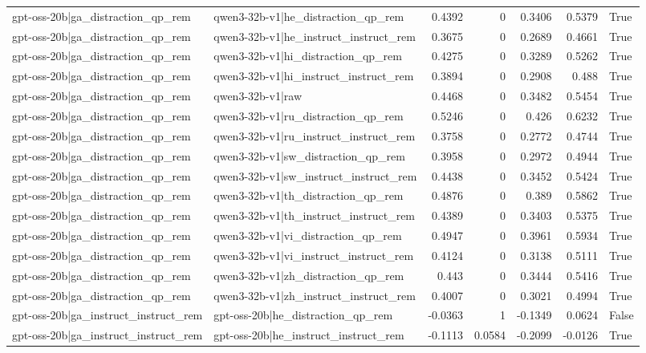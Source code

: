 \begin{table}
\begin{tabular}{l l r r r r l}
gpt-oss-20b|ga_distraction_qp_rem & qwen3-32b-v1|he_distraction_qp_rem & 0.4392 & 0 & 0.3406 & 0.5379 & True \\
gpt-oss-20b|ga_distraction_qp_rem & qwen3-32b-v1|he_instruct_instruct_rem & 0.3675 & 0 & 0.2689 & 0.4661 & True \\
gpt-oss-20b|ga_distraction_qp_rem & qwen3-32b-v1|hi_distraction_qp_rem & 0.4275 & 0 & 0.3289 & 0.5262 & True \\
gpt-oss-20b|ga_distraction_qp_rem & qwen3-32b-v1|hi_instruct_instruct_rem & 0.3894 & 0 & 0.2908 & 0.488 & True \\
gpt-oss-20b|ga_distraction_qp_rem & qwen3-32b-v1|raw & 0.4468 & 0 & 0.3482 & 0.5454 & True \\
gpt-oss-20b|ga_distraction_qp_rem & qwen3-32b-v1|ru_distraction_qp_rem & 0.5246 & 0 & 0.426 & 0.6232 & True \\
gpt-oss-20b|ga_distraction_qp_rem & qwen3-32b-v1|ru_instruct_instruct_rem & 0.3758 & 0 & 0.2772 & 0.4744 & True \\
gpt-oss-20b|ga_distraction_qp_rem & qwen3-32b-v1|sw_distraction_qp_rem & 0.3958 & 0 & 0.2972 & 0.4944 & True \\
gpt-oss-20b|ga_distraction_qp_rem & qwen3-32b-v1|sw_instruct_instruct_rem & 0.4438 & 0 & 0.3452 & 0.5424 & True \\
gpt-oss-20b|ga_distraction_qp_rem & qwen3-32b-v1|th_distraction_qp_rem & 0.4876 & 0 & 0.389 & 0.5862 & True \\
gpt-oss-20b|ga_distraction_qp_rem & qwen3-32b-v1|th_instruct_instruct_rem & 0.4389 & 0 & 0.3403 & 0.5375 & True \\
gpt-oss-20b|ga_distraction_qp_rem & qwen3-32b-v1|vi_distraction_qp_rem & 0.4947 & 0 & 0.3961 & 0.5934 & True \\
gpt-oss-20b|ga_distraction_qp_rem & qwen3-32b-v1|vi_instruct_instruct_rem & 0.4124 & 0 & 0.3138 & 0.5111 & True \\
gpt-oss-20b|ga_distraction_qp_rem & qwen3-32b-v1|zh_distraction_qp_rem & 0.443 & 0 & 0.3444 & 0.5416 & True \\
gpt-oss-20b|ga_distraction_qp_rem & qwen3-32b-v1|zh_instruct_instruct_rem & 0.4007 & 0 & 0.3021 & 0.4994 & True \\
gpt-oss-20b|ga_instruct_instruct_rem & gpt-oss-20b|he_distraction_qp_rem & -0.0363 & 1 & -0.1349 & 0.0624 & False \\
gpt-oss-20b|ga_instruct_instruct_rem & gpt-oss-20b|he_instruct_instruct_rem & -0.1113 & 0.0584 & -0.2099 & -0.0126 & True \\

\end{tabular}
\end{table}
